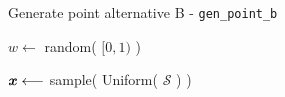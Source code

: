 \begin{algorithm}
\caption{Generate point alternative B - \texttt{gen\_point\_b}}\label{algo:gen-b}
\vspace{8pt}
\nosemic
\SetAlgoLined
{}

$w \longleftarrow $ random( $[0,1)$ ) \;

{
    $\boldsymbol{x} \longleftarrow $ sample( Uniform( $\mathcal{S}$ ) ) \;
} 


\end{algorithm}





%    

%    



